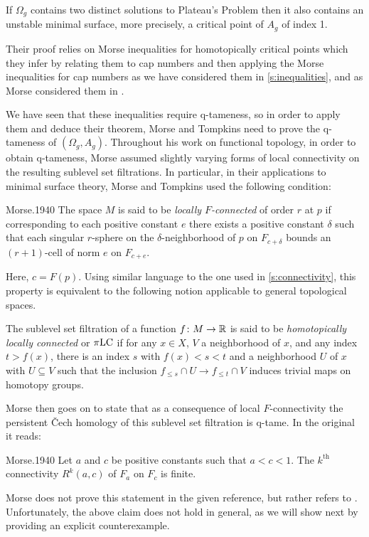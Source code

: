 \begin{thm}
	If $\Omega_g$ contains two distinct solutions to Plateau's Problem then it also contains an unstable minimal surface, more precisely, a critical point of $A_g$ of index 1.
\end{thm}

Their proof relies on Morse inequalities for homotopically critical points which they infer by relating them to cap numbers and then applying the Morse inequalities for cap numbers as we have considered them in \cref{s:inequalities}, and as Morse considered them in \cite{Morse.1940}.

We have seen that these inequalities require q-tameness, so in order to apply them and deduce their theorem, Morse and Tompkins need to prove the \mbox{q-tameness} of $(\Omega_g, A_g)$.
Throughout his work on functional topology, in order to obtain \mbox{q-tameness}, Morse assumed slightly varying forms of local connectivity on the resulting sublevel set filtrations.
In particular, in their applications to minimal surface theory, Morse and Tompkins used the following condition:
\begin{displaycquote}[p.~431]{Morse.1940}
	The space $M$ is said to be \emph{locally $F$-connected} of order $r$ at $p$ if corresponding to each positive constant $e$ there exists a positive constant $\delta$ such that each singular $r$-sphere on the $\delta$-neighborhood of $p$ on $F_{c+\delta}$ bounds an $(r+1)$-cell of norm $e$ on $F_{c+e}$.
\end{displaycquote}
Here, $c = F(p)$.
Using similar language to the one used in \cref{s:connectivity}, this property is equivalent to the following notion applicable to general topological spaces.

\begin{defi}
	The sublevel set filtration of a function $f \colon M \to \mathbb{R}$ is said to be \emph{homotopically locally connected} or $\pi\mathrm{LC}$	if for any $x \in X$, $V$ a neighborhood of $x$, and any index $t > f(x)$, there is an index $s$ with $f(x) < s < t$ and a neighborhood $U$ of $x$ with $U \subseteq V$ such that the inclusion $f_{\leq s} \cap U \to f_{\leq t} \cap V$ induces trivial maps on homotopy groups.
\end{defi}

Morse then goes on to state that as a consequence of local $F$-connectivity the persistent \v{C}ech homology of this sublevel set filtration is q-tame.
In the original it reads:
\begin{displaycquote}[Theorem 6.3, p.~432]{Morse.1940}
	Let $a$ and $c$ be positive constants such that $a < c < 1$.
	The $k^{\mathrm{th}}$ connectivity $R^k(a,c)$ of $F_a$ on $F_c$ is finite.
\end{displaycquote}
Morse does not prove this statement in the given reference, but rather refers to \cite[Theorem~6.1]{Morse.1938}.
Unfortunately, the above claim does not hold in general, as we will show next by providing an explicit counterexample.

